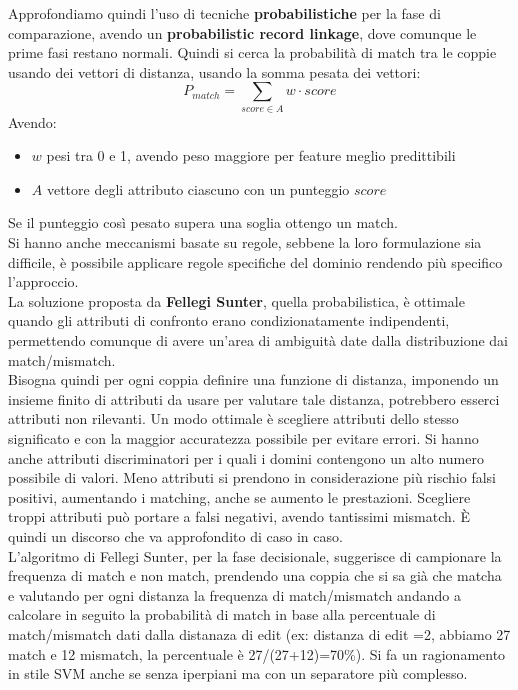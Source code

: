 Approfondiamo quindi l'uso di tecniche \textbf{probabilistiche} per la fase di comparazione, avendo un \textbf{probabilistic record linkage}, dove comunque le prime fasi restano normali. Quindi si cerca la probabilità di match tra le coppie usando dei vettori di distanza, usando la somma pesata dei vettori: 
\[P_{match}=\sum_{score\in A}w\cdot score\]
Avendo:
\begin{itemize}
  \item $w$ pesi tra 0 e 1, avendo peso maggiore per feature meglio predittibili
  \item $A$ vettore degli attributo ciascuno con un punteggio $score$
\end{itemize}
Se il punteggio così pesato supera una soglia ottengo un match.\\ Si hanno anche meccanismi basate su regole, sebbene la loro formulazione sia difficile, è possibile applicare regole specifiche del dominio rendendo più specifico l'approccio.\\ La soluzione proposta da \textbf{Fellegi Sunter}, quella probabilistica, è ottimale quando gli attributi di confronto erano condizionatamente indipendenti, permettendo comunque di avere un'area di ambiguità date dalla distribuzione dai match/mismatch.\\ 

Bisogna quindi per ogni coppia definire una funzione di distanza, imponendo un insieme finito di attributi da usare per valutare tale distanza, potrebbero esserci attributi non rilevanti. Un modo ottimale è scegliere attributi dello stesso significato e con la maggior accuratezza possibile per evitare errori. Si hanno anche attributi discriminatori per i quali i domini contengono un alto numero possibile di valori. Meno attributi si prendono in considerazione più rischio falsi positivi, aumentando i matching, anche se aumento le prestazioni. Scegliere troppi attributi può portare a falsi negativi, avendo tantissimi mismatch. È quindi un discorso che va approfondito di caso in caso.\\

L'algoritmo di Fellegi Sunter, per la fase decisionale, suggerisce di campionare la frequenza di match e non match, prendendo una coppia che si sa già che matcha e valutando per ogni distanza la frequenza di match/mismatch andando a calcolare in seguito la probabilità di match in base alla percentuale di match/mismatch dati dalla distanaza di edit (ex: distanza di edit =2, abbiamo 27 match e 12 mismatch, la percentuale è 27/(27+12)=70\%). Si fa un ragionamento in stile SVM anche se senza iperpiani ma con un separatore più complesso.\\

